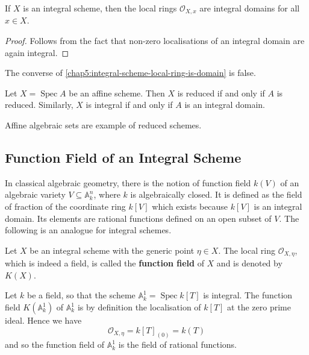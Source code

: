 \documentclass[12pt]{book}
\newcommand{\inlinedef}[1]{\textcolor{oxfordblue}{\bfseries #1}}
\theoremstyle{definition}
\newcommand{\AAA}{\mathbb A}
\DeclareMathOperator{\Spec}{Spec}
\begin{document}
	\begin{proposition}\label{chap5:integral-scheme-local-ring-is-domain}
		If $X$ is an integral scheme, then the local rings $\mathcal{O}_{X, x}$ are integral domains for all $x \in X$.
	\end{proposition}
	\begin{proof}
		Follows from the fact that non-zero localisations of an integral domain are again integral. 
	\end{proof}
	
	\begin{remark}
		The converse of \cref{chap5:integral-scheme-local-ring-is-domain} is false.
	\end{remark}
	
	\begin{example}
		Let $X = \Spec A$ be an affine scheme. Then $X$ is reduced if and only if $A$ is reduced. Similarly, $X$ is integral if and only if $A$ is an integral domain.
	\end{example}
	
	\begin{example}
		Affine algebraic sets are example of reduced schemes.
	\end{example}
	
	\subsection*{Function Field of an Integral Scheme}
	
	In classical algebraic geometry, there is the notion of function field $k(V)$ of an algebraic variety $V \subseteq \AAA^n_k$, where $k$ is algebraically closed. It is defined as the field of fraction of the coordinate ring $k[V]$ which exists because $k[V]$ is an integral domain. Its elements are rational functions defined on an open subset of $V$. The following is an analogue for integral schemes.	
	
	\begin{definition}
		Let $X$ be an integral scheme with the generic point $\eta \in X$. The local ring $\mathcal{O}_{X, \eta}$, which is indeed a field, is called the \inlinedef{function field} of $X$ and is denoted by $K(X)$.
	\end{definition}
	
	\begin{example}
		Let $k$ be a field, so that the scheme $\AAA^1_k = \Spec k[T]$ is integral. The function field $K(\AAA^1_k)$ of $\AAA^1_k$ is by definition the localisation of $k[T]$ at the zero prime ideal. Hence we have
		\begin{equation*}
			\mathcal{O}_{X, \eta} = k[T]_{(0)} = k(T)
		\end{equation*}
		and so the function field of $\AAA^1_k$ is the field of rational functions.
	\end{example}
	
\end{document}
